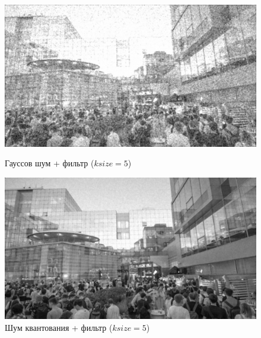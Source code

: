 \documentclass[a4paper]{article}
\begin{document}
\begin{figure}[H]
    \begin{minipage}{0.49\textwidth}
        \centering \includegraphics[width=\textwidth]{images/3_nonlinear_filters/gaussian - 2d-median (ksize=5).jpg}
        \caption{Гауссов шум + фильтр ($ksize = 5$)}
    \end{minipage}\hfill
    \begin{minipage}{0.49\textwidth}
        \centering \includegraphics[width=\textwidth]{images/3_nonlinear_filters/poisson - 2d-median (ksize=5).jpg}
        \caption{Шум квантования + фильтр ($ksize = 5$)}
    \end{minipage}
\end{figure}
\end{document}
